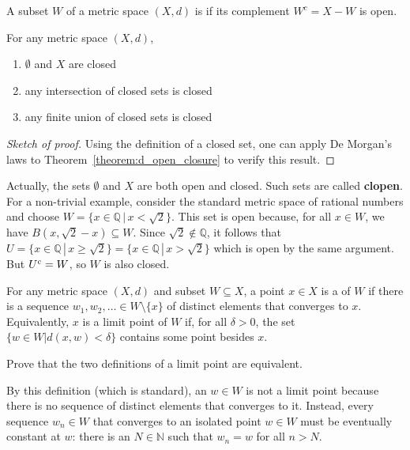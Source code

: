 \begin{definition}
A subset $W$ of a metric space $(X,d)$ is  if its complement $W^c = X-W$ is open.
\end{definition}

\begin{corollary}
For any metric space $(X,d)$,
\begin{enumerate}
\item $\emptyset$ and $X$ are closed
\item any intersection of closed sets is closed
\item any finite union of closed sets is closed
\end{enumerate}
\end{corollary}
\begin{proof}[Sketch of proof]
Using the definition of a closed set, one can apply De Morgan's laws to Theorem~\ref{theorem:d_open_closure} to verify this result.
\end{proof}

Actually, the sets $\emptyset$ and $X$ are both open and closed.
Such sets are called \textbf{clopen}.
For a non-trivial example, consider the standard metric space of rational numbers and choose $W = \{x\in \mathbb{Q}\,|\, x< \sqrt{2}\}$.
This set is open because, for all $x\in W$, we have $B(x,\sqrt{2}-x)\subseteq W$.
Since $\sqrt{2}\notin \mathbb{Q}$, it follows that $U = \{x\in \mathbb{Q}\,|\, x\geq \sqrt{2}\}=\{x\in \mathbb{Q}\,|\, x> \sqrt{2}\}$ which is open by the same argument.
But ${U}^{c} = W$, so $W$ is also closed.

\begin{definition}
For any metric space $(X,d)$ and subset $W \subseteq X$, a point $x\in X$ is a  of $W$ if there is a sequence $w_1,w_2,\ldots\in W \setminus \{ x \}$ of distinct elements that converges to $x$.
Equivalently, $x$ is a limit point of $W$ if, for all $\delta >0$, the set $\{ w\in W | d(x,w)<\delta \}$ contains some point besides $x$.
\end{definition}

\begin{problem}
Prove that the two definitions of a limit point are equivalent.
\end{problem}

By this definition (which is standard), an  $w\in W$ is not a limit point because there is no sequence of distinct elements that converges to it.
Instead, every sequence $w_n \in W$ that converges to an isolated point $w\in W$ must be eventually constant at $w$: there is an $N\in\mathbb N$ such that $w_n=w$ for all $n>N$.

